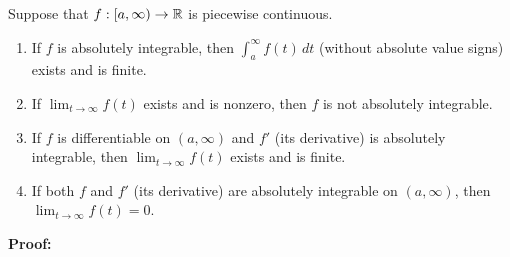 \begin{tcolorbox}[title=\textcolor{black}{Proof of Prop.~\ref{thm:UsefulAbsoluteIntegrability} (Usefulness of Absolute Integrability}, sharp corners, colback=green!30, colframe=green!80!blue, breakable, fonttitle=\bfseries]
Suppose that $f:[a, \infty) \to \mathbb R$ is piecewise continuous. 
\begin{enumerate}
\renewcommand{\labelenumi}{(\alph{enumi})}
\setlength{\itemsep}{.2cm}
    \item If $f$ is absolutely integrable, then $\int_a^\infty f(t) \, dt $ (without absolute value signs) exists and is finite.
    \item If $\displaystyle \lim_{t \to \infty} f(t)$ exists and is nonzero, then $f$ is not absolutely integrable.
    \item If $f$ is differentiable on $(a, \infty)$ and $f'$ (its derivative) is absolutely integrable, then $ \displaystyle \lim_{t \to \infty} f(t)$ exists and is finite. 
    \item If both $f$ and $f'$ (its derivative) are absolutely integrable on $(a, \infty)$, then $ \displaystyle \lim_{t \to \infty} f(t) = 0.$ 
\end{enumerate}
  
\end{tcolorbox}

\textbf{Proof:} 

